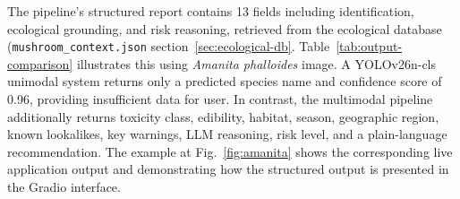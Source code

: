 \documentclass[journal,transmag]{IEEEtran}
\begin{document}
The pipeline's structured report contains 13 fields including identification, ecological grounding, and risk reasoning, retrieved from the ecological database
(\texttt{mushroom\_context.json} section~\ref{sec:ecological-db}. Table~\ref{tab:output-comparison} illustrates this using
\textit{Amanita phalloides} image. A YOLOv26n-cls unimodal system returns only a predicted species name and confidence score of 0.96, providing insufficient data for user. In contrast, the multimodal pipeline additionally returns toxicity class, edibility, habitat, season, geographic region, known lookalikes, key warnings, LLM reasoning, risk level, and a plain-language recommendation. The example at Fig.~\ref{fig:amanita} shows the corresponding live application output and demonstrating how the structured output is presented in the Gradio interface. 
\end{document}
